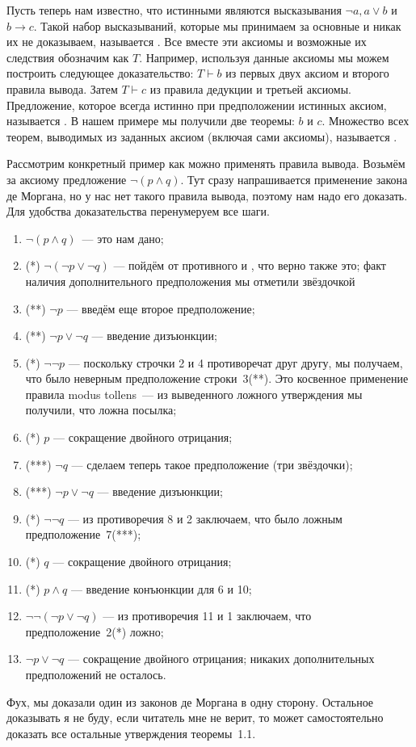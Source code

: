 Пусть теперь нам известно, что истинными являются высказывания $\neg a, a\lor b$ и $b\to c$. Такой набор высказываний, которые мы принимаем за основные и никак их не доказываем, называется . Все вместе эти аксиомы и возможные их следствия обозначим как $T$. Например, используя данные аксиомы мы можем построить следующее доказательство: $T\vdash b$ из первых двух аксиом и второго правила вывода. Затем $T\vdash c$ из правила дедукции и третьей аксиомы. Предложение, которое всегда истинно при предположении истинных аксиом, называется . В нашем примере мы получили две теоремы: $b$ и $c$. Множество всех теорем, выводимых из заданных аксиом (включая сами аксиомы), называется .

\begin{example}
Рассмотрим конкретный пример как можно применять правила вывода. Возьмём за аксиому предложение $\neg (p\land q)$. Тут сразу напрашивается применение закона де Моргана, но у нас нет такого правила вывода, поэтому нам надо его доказать. Для удобства доказательства перенумеруем все шаги.
\begin{enumerate}
\item $\neg (p\land q)$~— это нам дано;
\item (*) $\neg (\neg p \lor \neg q)$ — пойдём от противного и , что верно также это; факт наличия дополнительного предположения мы отметили звёздочкой
\item (**) $\neg p$ — введём еще второе предположение;
\item (**) $\neg p \lor \neg q$ — введение  дизъюнкции;
\item (*) $\neg \neg p$ — поскольку строчки 2 и 4 противоречат друг другу, мы получаем, что было неверным предположение строки~3(**). Это косвенное применение правила modus tollens~— из выведенного ложного утверждения мы получили, что ложна посылка;
\item (*) $p$ — сокращение двойного отрицания;
\item (***) $\neg q$ — сделаем теперь такое предположение (три звёздочки);
\item (***) $\neg p \lor \neg q$ — введение дизъюнкции;
\item (*) $\neg \neg q$ — из противоречия 8 и 2 заключаем, что было ложным предположение~7(***);
\item (*) $q$ — сокращение двойного отрицания;
\item (*) $p\land q$ — введение конъюнкции для 6 и 10;
\item $\neg\neg(\neg p\lor \neg q)$ — из противоречия 11 и 1 заключаем, что предположение~2(*) ложно;
\item $\neg p\lor \neg q$ — сокращение двойного отрицания; никаких дополнительных предположений не осталось.
\end{enumerate}
Фух, мы доказали один из законов де Моргана в одну сторону. Остальное доказывать я не буду, если читатель мне не верит, то может самостоятельно доказать все остальные утверждения теоремы~1.1.
\end{example}

